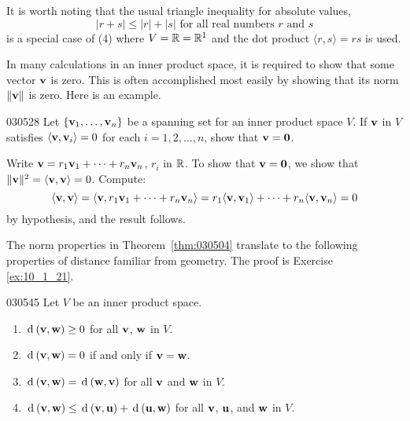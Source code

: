 \noindent It is worth noting that the usual triangle inequality for absolute values,
\begin{equation*}
| r + s | \leq |r| + |s| \mbox{ for all real numbers } r \mbox{ and } s
\end{equation*}
is a special case of (4) where $V = \mathbb{R} = \mathbb{R}^1$ and the dot product $\langle r, s \rangle = rs$ is used.

In many calculations in an inner product space, it is required to show that some vector $\textbf{v}$ is zero. This is often accomplished most easily by showing that its norm $\|\textbf{v}\|$ is zero. Here is an example.

\begin{example}{}{030528}
Let $\{\textbf{v}_{1}, \dots, \textbf{v}_{n}\}$ be a spanning set for an inner product space $V$. If $\textbf{v}$ in $V$ satisfies $\langle\textbf{v}, \textbf{v}_{i}\rangle = 0$ for each $i = 1, 2, \dots, n$, show that $\textbf{v} = \textbf{0}$.

\begin{solution}
Write $\textbf{v} = r_{1}\textbf{v}_{1} + \dots + r_{n}\textbf{v}_{n}$, $r_{i}$ in $\mathbb{R}$. To show that $\textbf{v} = \textbf{0}$, we show that $\|\textbf{v}\|^{2} = \langle\textbf{v}, \textbf{v}\rangle = 0$. Compute:
\begin{equation*}
\langle \textbf{v}, \textbf{v} \rangle 
= \langle \textbf{v}, r_1\textbf{v}_1 + \dots + r_n\textbf{v}_n \rangle 
= r_1\langle \textbf{v}, \textbf{v}_1 \rangle + \dots + r_n \langle \textbf{v}, \textbf{v}_n \rangle
= 0
\end{equation*}
by hypothesis, and the result follows.
\end{solution}
\end{example}

The norm properties in Theorem~\ref{thm:030504} translate to the following properties of distance familiar from geometry. The proof is Exercise \ref{ex:10_1_21}.

\begin{theorem}{}{030545}
Let $V$ be an inner product space.

\begin{enumerate}
\item $\thinspace\operatorname{d\medspace}(\textbf{v}, \textbf{w}) \geq 0$ for all $\textbf{v}$, $\textbf{w}$ in $V$.

\item $\thinspace\operatorname{d\medspace}(\textbf{v}, \textbf{w}) = 0$ if and only if $\textbf{v} = \textbf{w}$.

\item $\thinspace\operatorname{d\medspace}(\textbf{v}, \textbf{w}) = \thinspace\operatorname{d\medspace}(\textbf{w}, \textbf{v})$ for all $\textbf{v}$ and $\textbf{w}$ in $V$.

\item $\thinspace\operatorname{d\medspace}(\textbf{v}, \textbf{w}) \leq \thinspace\operatorname{d\medspace}(\textbf{v}, \textbf{u}) + \thinspace\operatorname{d\medspace}(\textbf{u}, \textbf{w})$ for all $\textbf{v}$, $\textbf{u}$, and $\textbf{w}$ in $V$.

\end{enumerate}
\end{theorem}


